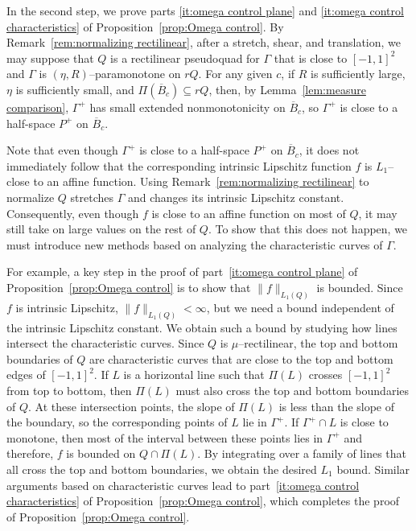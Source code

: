 \documentclass[11pt,reqno]{amsart}
\newcommand{\0}{\mathbf{0}}
\renewcommand{\1}{\mathbf 1}
\renewcommand{\subset}{\subseteq}
\theoremstyle{remark}
\begin{document}
In the second step, we prove parts \ref{it:omega control plane} and \ref{it:omega control characteristics} of Proposition~\ref{prop:Omega control}.  By Remark~\ref{rem:normalizing rectilinear}, after a stretch, shear, and translation, we may suppose that $Q$ is a rectilinear pseudoquad for $\Gamma$ that is close to $[-1,1]^2$ and $\Gamma$ is $(\eta, R)$--paramonotone on $rQ$.  For any given $c$, if $R$ is sufficiently large, $\eta$ is sufficiently small, and $\Pi(\overline{B}_c)\subset rQ$, then, by Lemma~\ref{lem:measure comparison}, $\Gamma^+$ has small extended nonmonotonicity on $\overline{B}_c$, so $\Gamma^+$ is close to a half-space $P^+$ on $\overline{B}_c$.

Note that even though $\Gamma^+$ is close to a half-space $P^+$ on $\overline{B}_c$, it does not immediately follow that the corresponding intrinsic Lipschitz function $f$ is $L_1$--close to an affine function. Using Remark~\ref{rem:normalizing rectilinear} to normalize $Q$ stretches $\Gamma$ and changes its intrinsic Lipschitz constant. Consequently, even though $f$ is close to an affine function on most of $Q$, it may still take on large values on the rest of $Q$. To show that this does not happen, we must introduce new methods based on analyzing the characteristic curves of $\Gamma$.

For example, a key step in the proof of part~\ref{it:omega control plane} of Proposition~\ref{prop:Omega control} is to show that $\|f\|_{L_1(Q)}$ is bounded.  Since $f$ is intrinsic Lipschitz, $\|f\|_{L_1(Q)}<\infty$, but we need a bound independent of the intrinsic Lipschitz constant.  We obtain such a bound by studying how lines intersect the characteristic curves.  Since $Q$ is $\mu$--rectilinear, the top and bottom boundaries of $Q$ are characteristic curves that are close to the top and bottom edges of $[-1,1]^2$.   If $L$ is a horizontal line such that $\Pi(L)$ crosses $[-1,1]^2$ from top to bottom, then $\Pi(L)$ must also cross the top and bottom boundaries of $Q$.  At these intersection points, the slope of $\Pi(L)$ is less than the slope of the boundary, so the corresponding points of $L$ lie in $\Gamma^+$.  If $\Gamma^+\cap L$ is close to monotone, then most of the interval between these points lies in $\Gamma^+$ and therefore, $f$ is bounded on $Q\cap \Pi(L)$.  By integrating over a family of lines that all cross the top and bottom boundaries, we obtain the desired $L_1$ bound.  Similar arguments based on characteristic curves lead to part~\ref{it:omega control characteristics} of Proposition~\ref{prop:Omega control}, which completes the proof of Proposition~\ref{prop:Omega control}.
\end{document}
